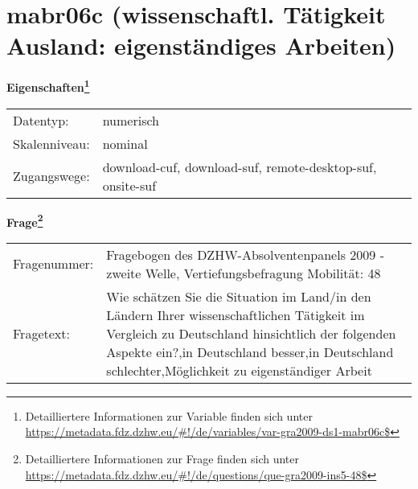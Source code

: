 
    \setcounter{footnote}{0}

    \vspace*{-1.8cm}
	\section{mabr06c (wissenschaftl. Tätigkeit Ausland: eigenständiges Arbeiten)}
	\label{section:mabr06c}



    \vspace*{0.5cm}
    \noindent\textbf{Eigenschaften\footnote{Detailliertere Informationen zur Variable finden sich unter
		\url{https://metadata.fdz.dzhw.eu/\#!/de/variables/var-gra2009-ds1-mabr06c$}}}\\
	\begin{tabularx}{\hsize}{@{}lX}
	Datentyp: & numerisch \\
	Skalenniveau: & nominal \\
	Zugangswege: &
	  download-cuf, 
	  download-suf, 
	  remote-desktop-suf, 
	  onsite-suf
 \\
    \end{tabularx}



				\vspace*{0.5cm}
                \noindent\textbf{Frage\footnote{Detailliertere Informationen zur Frage finden sich unter
		              \url{https://metadata.fdz.dzhw.eu/\#!/de/questions/que-gra2009-ins5-48$}}}\\
				\begin{tabularx}{\hsize}{@{}lX}
					Fragenummer: &
					  Fragebogen des DZHW-Absolventenpanels 2009 - zweite Welle, Vertiefungsbefragung Mobilität:
					  48
 \\
					Fragetext: & Wie schätzen Sie die Situation im Land/in den Ländern Ihrer wissenschaftlichen Tätigkeit im Vergleich zu Deutschland hinsichtlich der folgenden Aspekte ein?,in Deutschland besser,in Deutschland schlechter,Möglichkeit zu eigenständiger Arbeit \\
				\end{tabularx}





